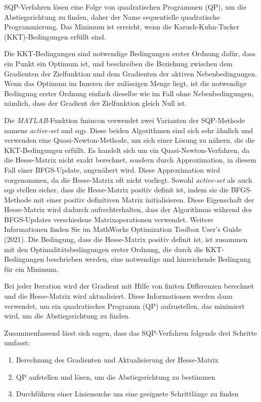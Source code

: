 SQP-Verfahren lösen eine Folge von quadratischen Programmen (QP), um die Abstiegsrichtung zu finden, daher der Name sequentielle quadratische Programmierung. Das Minimum ist erreicht, wenn die Karush-Kuhn-Tucker (KKT)-Bedingungen erfüllt sind.

Die KKT-Bedingungen sind notwendige Bedingungen erster Ordnung dafür, dass ein Punkt ein Optimum ist, und beschreiben die Beziehung zwischen dem Gradienten der Zielfunktion und dem Gradienten der aktiven Nebenbedingungen. Wenn das Optimum im Inneren der zulässigen Menge liegt, ist die notwendige Bedingung erster Ordnung einfach dieselbe wie im Fall ohne Nebenbedingungen, nämlich, dass der Gradient der Zielfunktion gleich Null ist.

Die \textit{MATLAB}-Funktion fmincon verwendet zwei Varianten der SQP-Methode namens \textit{active-set} und sqp. Diese beiden Algorithmen sind sich sehr ähnlich und verwenden eine Quasi-Newton-Methode, um sich einer Lösung zu nähern, die die KKT-Bedingungen erfüllt. Es handelt sich um ein Quasi-Newton-Verfahren, da die Hesse-Matrix nicht exakt berechnet, sondern durch Approximation, in diesem Fall einer BFGS-Update, angenähert wird. Diese Approximation wird vorgenommen, da die Hesse-Matrix oft nicht vorliegt. Sowohl \textit{active-set} als auch sqp stellen sicher, dass die Hesse-Matrix positiv definit ist, indem sie die BFGS-Methode mit einer positiv definitiven Matrix initialisieren. Diese Eigenschaft der Hesse-Matrix wird dadurch aufrechterhalten, dass der Algorithmus während des BFGS-Updates verschiedene Matrixoperationen verwendet. Weitere Informationen finden Sie im MathWorks Optimization Toolbox User's Guide (2021). Die Bedingung, dass die Hesse-Matrix positiv definit ist, ist zusammen mit den Optimalitätsbedingungen erster Ordnung, die durch die KKT-Bedingungen beschrieben werden, eine notwendige und hinreichende Bedingung für ein Minimum. 

Bei jeder Iteration wird der Gradient mit Hilfe von finiten Differenzen berechnet und die Hesse-Matrix wird aktualisiert. Diese Informationen werden dann verwendet, um ein quadratisches Programm (QP) aufzustellen, das minimiert wird, um die Abstiegsrichtung zu finden.

Zusammenfassend lässt sich sagen, dass das SQP-Verfahren folgende drei Schritte umfasst:
\begin{enumerate}
    \item Berechnung des Gradienten und Aktualisierung der Hesse-Matrix
    \item QP aufstellen und lösen, um die Abstiegsrichtung zu bestimmen
    \item Durchführen einer Liniensuche um eine geeignete Schrittlänge zu finden
\end{enumerate}

